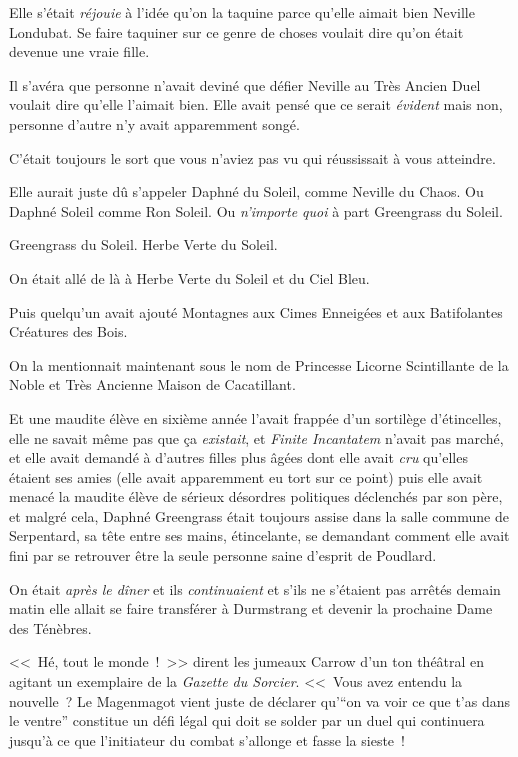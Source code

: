 Elle s'était \emph{réjouie} à l'idée qu'on la taquine parce qu'elle aimait bien Neville Londubat. Se faire taquiner sur ce genre de choses voulait dire qu'on était devenue une vraie fille.

Il s'avéra que personne n'avait deviné que défier Neville au Très Ancien Duel voulait dire qu'elle l'aimait bien. Elle avait pensé que ce serait \emph{évident} mais non, personne d'autre n'y avait apparemment songé.

C'était toujours le sort que vous n'aviez pas vu qui réussissait à vous atteindre.

Elle aurait juste dû s'appeler Daphné du Soleil, comme Neville du Chaos. Ou Daphné Soleil comme Ron Soleil. Ou \emph{n'importe quoi} à part Greengrass du Soleil.

Greengrass du Soleil. Herbe Verte du Soleil.

On était allé de là à Herbe Verte du Soleil et du Ciel Bleu.

Puis quelqu'un avait ajouté Montagnes aux Cimes Enneigées et aux Batifolantes Créatures des Bois.

On la mentionnait maintenant sous le nom de Princesse Licorne Scintillante de la Noble et Très Ancienne Maison de Cacatillant.

Et une maudite élève en sixième année l'avait frappée d'un sortilège d'étincelles, elle ne savait même pas que ça \emph{existait}, et \emph{Finite Incantatem} n'avait pas marché, et elle avait demandé à d'autres filles plus âgées dont elle avait \emph{cru} qu'elles étaient ses amies (elle avait apparemment eu tort sur ce point) puis elle avait menacé la maudite élève de sérieux désordres politiques déclenchés par son père, et malgré cela, Daphné Greengrass était toujours assise dans la salle commune de Serpentard, sa tête entre ses mains, étincelante, se demandant comment elle avait fini par se retrouver être la seule personne saine d'esprit de Poudlard.

On était \emph{après le dîner} et ils \emph{continuaient} et s'ils ne s'étaient pas arrêtés demain matin elle allait se faire transférer à Durmstrang et devenir la prochaine Dame des Ténèbres.

<<~Hé, tout le monde~!~>> dirent les jumeaux Carrow d'un ton théâtral en agitant un exemplaire de la \emph{Gazette du Sorcier}. <<~Vous avez entendu la nouvelle~? Le Magenmagot vient juste de déclarer qu'“on va voir ce que t'as dans le ventre” constitue un défi légal qui doit se solder par un duel qui continuera jusqu'à ce que l'initiateur du combat s'allonge et fasse la sieste~!

